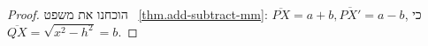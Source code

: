\begin{proof}
%

הוכחנו את משפט%
~\ref{thm.add-subtract-mm}:
$\overline{PX}=a+b, \overline{PX'}=a-b$,
כי
$\overline{QX}=\sqrt{x^2-h^2}=b$.
\end{proof}


